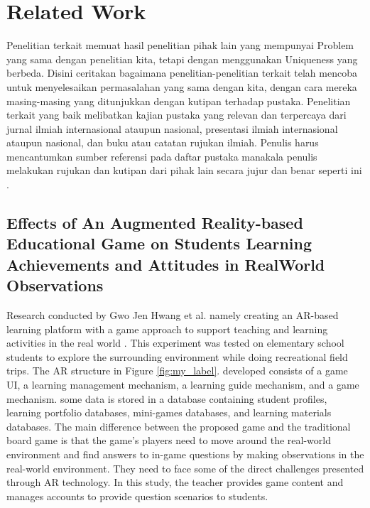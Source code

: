 \section{Related Work}
Penelitian terkait memuat hasil penelitian pihak lain yang mempunyai Problem yang sama dengan penelitian kita, tetapi dengan menggunakan Uniqueness yang berbeda. Disini ceritakan bagaimana penelitian-penelitian terkait telah mencoba untuk menyelesaikan permasalahan yang sama dengan kita, dengan cara mereka masing-masing yang ditunjukkan dengan kutipan terhadap pustaka. Penelitian terkait yang baik melibatkan kajian pustaka yang relevan dan terpercaya dari jurnal ilmiah internasional ataupun nasional, presentasi ilmiah internasional ataupun nasional, dan buku atau catatan rujukan ilmiah. Penulis harus mencantumkan sumber referensi pada daftar pustaka manakala penulis melakukan rujukan dan kutipan dari pihak lain secara jujur dan benar seperti ini \citep{Hwang2016}.

\subsection{Effects of An Augmented Reality-based Educational Game on Students
Learning Achievements and Attitudes in RealWorld Observations}
Research conducted by Gwo Jen Hwang et al. namely creating an AR-based learning platform with a game approach to support teaching and learning activities in the real world \citep{Hwang2016}. This experiment was tested on elementary school students to explore the surrounding environment while doing recreational field trips. The AR structure in Figure \ref{fig:my_label}. developed consists of a game UI, a learning management mechanism, a learning guide mechanism, and a game mechanism. some data is stored in a database containing student profiles, learning portfolio databases, mini-games databases, and learning materials databases. The main difference between the proposed game and the traditional board game is that the game's players need to move around the real-world environment and find answers to in-game questions by making observations in the real-world environment. They need to face some of the direct challenges presented through AR technology. In this study, the teacher provides game content and manages accounts to provide question scenarios to students.

